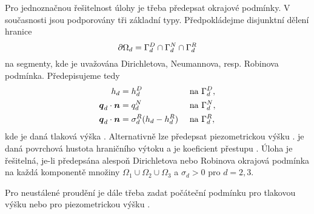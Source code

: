 Pro jednoznačnou řešitelnost úlohy je třeba předepsat okrajové podmínky. V současnosti jsou podporovány tři základní typy. 
Předpokládejme disjunktní dělení hranice
\[
    \partial\Omega_d = \Gamma_d^D \cap \Gamma_d^N \cap \Gamma_d^R
\]
na segmenty, kde je uvažována Dirichletova, Neumannova, resp. Robinova podmínka. Předepisujeme tedy
\begin{align}
    h_d &= h_d^D        &&\text{ na }\Gamma_d^D,\\
    \mathbf{\boldsymbol{q}}_d \cdot \mathbf{\boldsymbol{n}} &= q_d^N         &&\text{ na }\Gamma_d^N,\\
    \mathbf{\boldsymbol{q}}_d \cdot \mathbf{\boldsymbol{n}} &= \sigma_d^R ( h_d - h_d^R)     &&\text{ na }\Gamma_d^R,
\end{align}
kde
je daná tlaková výška . Alternativně lze předepsat piezometrickou výšku
.
je daná povrchová hustota hraničního výtoku  a
je koeficient přestupu .
Úloha je řešitelná, je-li předepsána alespoň Dirichletova nebo Robinova okrajová podmínka na každá komponentě množiny $\Omega_1 \cup \Omega_2 \cup \Omega_3$ a $\sigma_d >0$ pro $d=2,3$.

Pro neustálené proudění je dále třeba zadat počáteční podmínku pro tlakovou výšku
nebo pro piezometrickou výšku
.




